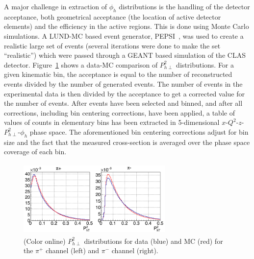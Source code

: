 \documentclass[aps,prl,twocolumn,showpacs,superscriptaddress,groupedaddress]{revtex4-1}  %
\newcommand{\Phperp}{P_{h\perp}}
\begin{document}
A major challenge in extraction of $\phi_h$ distributions is the handling of the detector acceptance, both geometrical acceptance (the location of active detector elements) and the efficiency in the active regions.
This is done using Monte Carlo simulations.
A LUND-MC based event generator, PEPSI~\cite{Mankiewicz:1991dp}, was used to create a realistic large set of events (several iterations were done to make the set ``realistic'') which were passed through a GEANT based simulation of the CLAS detector.
Figure~\ref{fig:pt2_data_mc_comparison} shows a data-MC comparison of $P_{h\perp}^2$ distributions.
For a given kinematic bin, the acceptance is equal to the number of reconstructed events divided by the number of generated events.
The number of events in the experimental data is then divided by the acceptance to get a corrected value for the number of events.
After events have been selected and binned, and after all corrections, including bin centering corrections, have been applied, 
a table of values of counts in elementary bins has been extracted in 5-dimensional $x$-$Q^2$-$z$-$\Phperp^2$-$\phi_h$ phase space.
The aforementioned bin centering corrections adjust for bin size and the fact that the measured cross-section is averaged over the phase space coverage of each bin.
\begin{figure}[htp]
\centering
\includegraphics[width=3.0in,height=1.5in]{plots/pt2_data_mc_comparison.png}
\caption{(Color online) $P_{h\perp}^2$ distributions for data (blue) and MC (red) for the $\pi^+$ channel (left) and $\pi^-$ channel (right).}
\label{fig:pt2_data_mc_comparison}
\end{figure}
\end{document}

